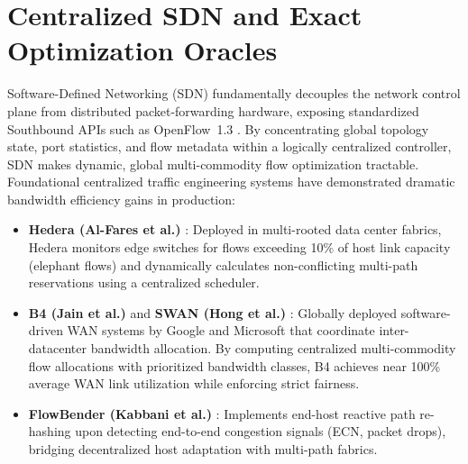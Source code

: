 \documentclass[12pt,a4paper,oneside]{report}
\begin{document}
\section{Centralized SDN and Exact Optimization Oracles}
\label{sec:lit_sdn_oracles}
Software-Defined Networking (SDN) fundamentally decouples the network control plane from distributed packet-forwarding hardware, exposing standardized Southbound APIs such as OpenFlow~1.3 \cite{mckeown2008openflow,onf2012openflow}. By concentrating global topology state, port statistics, and flow metadata within a logically centralized controller, SDN makes dynamic, global multi-commodity flow optimization tractable. Foundational centralized traffic engineering systems have demonstrated dramatic bandwidth efficiency gains in production:
\begin{itemize}
  \item \textbf{Hedera (Al-Fares et al.)} \cite{alfares2010hedera}: Deployed in multi-rooted data center fabrics, Hedera monitors edge switches for flows exceeding 10\% of host link capacity (elephant flows) and dynamically calculates non-conflicting multi-path reservations using a centralized scheduler.
  \item \textbf{B4 (Jain et al.)} \cite{jain2013b4} and \textbf{SWAN (Hong et al.)} \cite{hong2013swan}: Globally deployed software-driven WAN systems by Google and Microsoft that coordinate inter-datacenter bandwidth allocation. By computing centralized multi-commodity flow allocations with prioritized bandwidth classes, B4 achieves near 100\% average WAN link utilization while enforcing strict fairness.
  \item \textbf{FlowBender (Kabbani et al.)} \cite{kabbani2014flowbender}: Implements end-host reactive path re-hashing upon detecting end-to-end congestion signals (ECN, packet drops), bridging decentralized host adaptation with multi-path fabrics.
\end{itemize}
\end{document}
